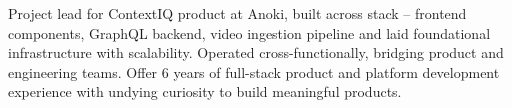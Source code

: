 

Project lead for ContextIQ product at Anoki, built across stack -- frontend components,
GraphQL backend, video ingestion pipeline and laid foundational infrastructure with scalability.
Operated cross-functionally, bridging product and engineering teams.
Offer 6 years of full-stack product and platform development experience with undying curiosity to build meaningful products.